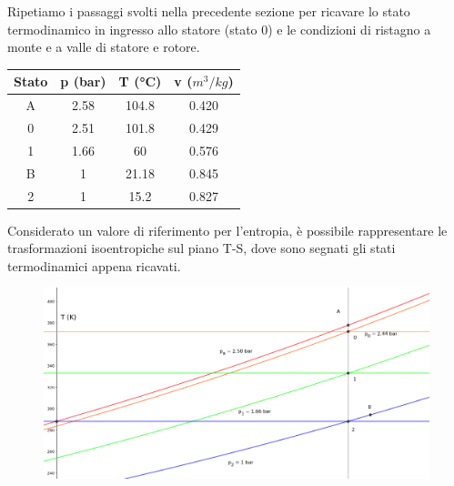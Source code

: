 \documentclass[a4paper,12pt]{article}
\begin{document}
Ripetiamo i passaggi svolti nella precedente sezione per ricavare lo stato termodinamico in ingresso allo statore (stato 0) e le
condizioni di ristagno a monte e a valle di statore e rotore.
\begin{center}
    \begin{tabular}{c|c|c|c}
        Stato   &p (bar)    &T (°C) &v ($m^3/kg$) \\ \hline
        A       &2.58       &104.8  &0.420  \\
        0       &2.51       &101.8  &0.429  \\
        1       &1.66       &60     &0.576  \\
        B       &1          &21.18  &0.845  \\
        2       &1          &15.2   &0.827  
    \end{tabular}
\end{center}

Considerato un valore di riferimento per l'entropia, è possibile rappresentare le trasformazioni isoentropiche sul piano T-S, dove sono segnati gli stati termodinamici
appena ricavati.
\begin{figure}[H]
    \label{fig:trasformazioni_TS_reazione}
    \centering
    \includegraphics[width=.99\linewidth]{media/trasformazioni_TS_reazione.png}
\end{figure}
\end{document}
